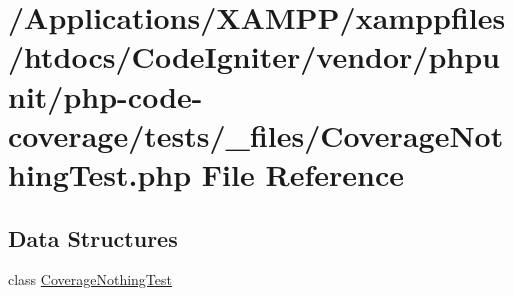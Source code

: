 \hypertarget{php-code-coverage_2tests_2__files_2_coverage_nothing_test_8php}{}\section{/\+Applications/\+X\+A\+M\+P\+P/xamppfiles/htdocs/\+Code\+Igniter/vendor/phpunit/php-\/code-\/coverage/tests/\+\_\+files/\+Coverage\+Nothing\+Test.php File Reference}
\label{php-code-coverage_2tests_2__files_2_coverage_nothing_test_8php}
\subsection*{Data Structures}
\begin{DoxyCompactItemize}
\item 
class \mbox{\hyperlink{class_coverage_nothing_test}{Coverage\+Nothing\+Test}}
\end{DoxyCompactItemize}
